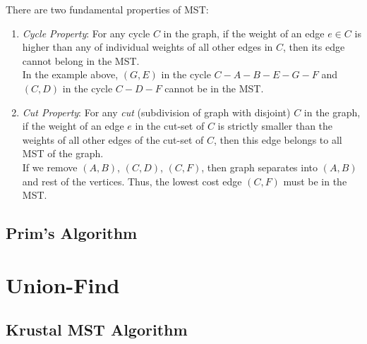 There are two fundamental properties of MST:

\begin{enumerate}
  \item \textit{Cycle Property}: For any cycle $C$ in the graph, if the weight of an edge $e \in C$ is higher than any of individual weights of all other edges in $C$, then its edge cannot belong in the MST.\\
    In the example above, $(G, E)$ in the cycle $C-A-B-E-G-F$ and $(C, D)$ in the cycle $C-D-F$ cannot be in the MST.
  \item \textit{Cut Property}: For any \textit{cut} (subdivision of graph with disjoint) $C$ in the graph, if the weight of an edge $e$ in the cut-set of $C$ is strictly smaller than the weights of all other edges of the cut-set of $C$, then this edge belongs to all MST of the graph.\\
    If we remove $(A,B)$, $(C,D)$, $(C,F)$, then graph separates into $(A,B)$ and rest of the vertices. Thus, the lowest cost edge $(C, F)$ must be in the MST.
\end{enumerate}

\subsection{Prim's Algorithm}

\section{Union-Find}

\subsection{Krustal MST Algorithm}

